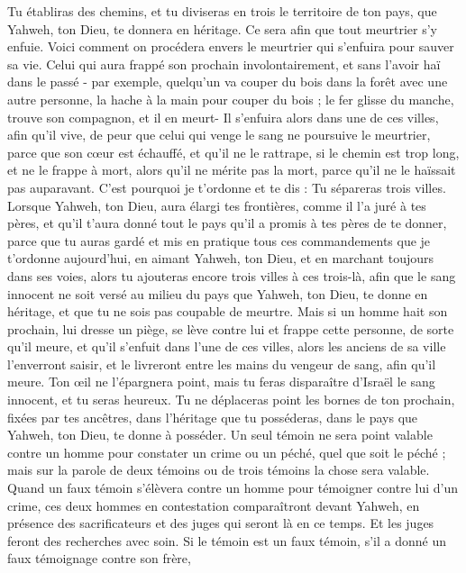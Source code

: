 \begin{multicols}{2}
Tu établiras des chemins, et tu diviseras en trois le territoire de ton pays, que Yahweh, ton Dieu, te donnera en héritage. Ce sera afin que tout meurtrier s'y enfuie.
Voici comment on procédera envers le meurtrier qui s’enfuira pour sauver sa vie. Celui qui aura frappé son prochain involontairement, et sans l'avoir haï dans le passé -
par exemple, quelqu'un va couper du bois dans la forêt avec une autre personne, la hache à la main pour couper du bois ; le fer glisse du manche, trouve son compagnon, et il en meurt- Il s'enfuira alors dans une de ces villes, afin qu'il vive,
de peur que celui qui venge le sang ne poursuive le meurtrier, parce que son cœur est échauffé, et qu'il ne le rattrape, si le chemin est trop long, et ne le frappe à mort, alors qu’il ne mérite pas la mort, parce qu'il ne le haïssait pas auparavant.
C'est pourquoi je t’ordonne et te dis : Tu sépareras trois villes.
Lorsque Yahweh, ton Dieu, aura élargi tes frontières, comme il l'a juré à tes pères, et qu'il t’aura donné tout le pays qu'il a promis à tes pères de te donner,
parce que tu auras gardé et mis en pratique tous ces commandements que je t’ordonne aujourd'hui, en aimant Yahweh, ton Dieu, et en marchant toujours dans ses voies, alors tu ajouteras encore trois villes à ces trois-là,
afin que le sang innocent ne soit versé au milieu du pays que Yahweh, ton Dieu, te donne en héritage, et que tu ne sois pas coupable de meurtre.
Mais si un homme hait son prochain, lui dresse un piège, se lève contre lui et frappe cette personne, de sorte qu’il meure, et qu'il s'enfuit dans l'une de ces villes,
alors les anciens de sa ville l’enverront saisir, et le livreront entre les mains du vengeur de sang, afin qu'il meure.
Ton œil ne l'épargnera point, mais tu feras disparaître d’Israël le sang innocent, et tu seras heureux.
Tu ne déplaceras point les bornes de ton prochain, fixées par tes ancêtres, dans l'héritage que tu posséderas, dans le pays que Yahweh, ton Dieu, te donne à posséder.
Un seul témoin ne sera point valable contre un homme pour constater un crime ou un péché, quel que soit le péché ; mais sur la parole de deux témoins ou de trois témoins la chose sera valable.
Quand un faux témoin s'élèvera contre un homme pour témoigner contre lui d’un crime,
ces deux hommes en contestation comparaîtront devant Yahweh, en présence des sacrificateurs et des juges qui seront là en ce temps.
Et les juges feront des recherches avec soin. Si le témoin est un faux témoin, s’il a donné un faux témoignage contre son frère,

\end{multicols}
